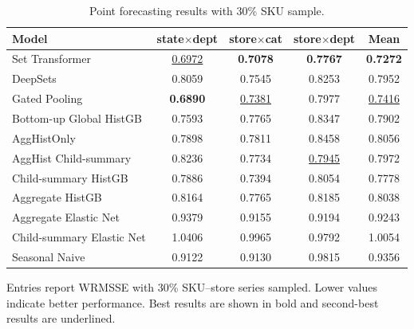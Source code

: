 \documentclass[12pt]{article}
\begin{document}
\begin{table}[H]
  \centering
  \caption{Point forecasting results with 30\% SKU sample.}
  \label{tab:appendix_point_30pct}
  \begin{threeparttable}
    \begin{tabular}{lcccc}
      \toprule
      Model                     & state$\times$dept  & store$\times$cat   & store$\times$dept  & Mean               \\
      \midrule
      Set Transformer                & \underline{0.6972} & \textbf{0.7078}    & \textbf{0.7767}    & \textbf{0.7272}    \\
      DeepSets                       & 0.8059             & 0.7545             & 0.8253             & 0.7952             \\
      Gated Pooling                  & \textbf{0.6890}    & \underline{0.7381} & 0.7977             & \underline{0.7416} \\
      Bottom-up Global HistGB        & 0.7593             & 0.7765             & 0.8347             & 0.7902             \\
      AggHistOnly                    & 0.7898             & 0.7811             & 0.8458             & 0.8056             \\
      AggHist Child-summary          & 0.8236             & 0.7734             & \underline{0.7945} & 0.7972             \\
      Child-summary HistGB           & 0.7886             & 0.7394             & 0.8054             & 0.7778             \\
      Aggregate HistGB               & 0.8164             & 0.7765             & 0.8185             & 0.8038             \\
      Aggregate Elastic Net          & 0.9379             & 0.9155             & 0.9194             & 0.9243             \\
      Child-summary Elastic Net      & 1.0406             & 0.9965             & 0.9792             & 1.0054             \\
      Seasonal Naive                 & 0.9122             & 0.9130             & 0.9815             & 0.9356             \\
      \bottomrule
    \end{tabular}
    \begin{tablenotes}
      \footnotesize \item Entries report WRMSSE with 30\% SKU--store series sampled. Lower values indicate better performance. Best results are shown in bold and second-best results are underlined.
    \end{tablenotes}
  \end{threeparttable}
\end{table}
\end{document}

